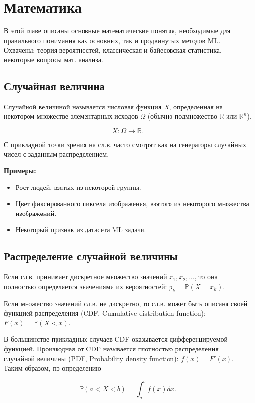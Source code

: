 \chapter{Математика}

В этой главе описаны основные математические понятия, необходимые для правильного понимания как основных, так и продвинутых методов ML. Охвачены: теория вероятностей, классическая и байесовская статистика, некоторые вопросы мат. анализа.


\section{Случайная величина}

Случайной величиной называется числовая функция $X$, определенная на некотором множестве элементарных исходов $\Omega$ (обычно подмножество $\mathbb{R}$ или $\mathbb{R}^n$), 

$$
X: \Omega\rightarrow\mathbb{R}.
$$

С прикладной точки зрения на сл.в. часто смотрят как на генераторы случайных чисел с заданным распределением.

\textbf{Примеры:}
\begin{itemize}
    \item Рост людей, взятых из некоторой группы.
    \item Цвет фиксированного пикселя изображения, взятого из некоторого множества изображений.
    \item Некоторый признак из датасета ML задачи.
\end{itemize}


\section{Распределение случайной величины}

Если сл.в. принимает дискретное множество значений $x_1,x_2,...$, то она полностью определяется значениями их вероятностей: $p_k=\mathbb{P}(X=x_k)$.

Если множество значений сл.в. не дискретно, то сл.в. может быть описана своей функцией распределения (CDF, Cumulative distribution function): $F(x)=\mathbb{P}(X<x)$.

В большинстве прикладных случаев CDF оказывается дифференцируемой функцией. Производная от CDF называется плотностью распределения случайной величины (PDF, Probability density function): $f(x)=F'(x)$. Таким образом, по определению 

$$
\mathbb{P}(a<X<b)=\int_{a}^{b}f(x)dx.
$$



